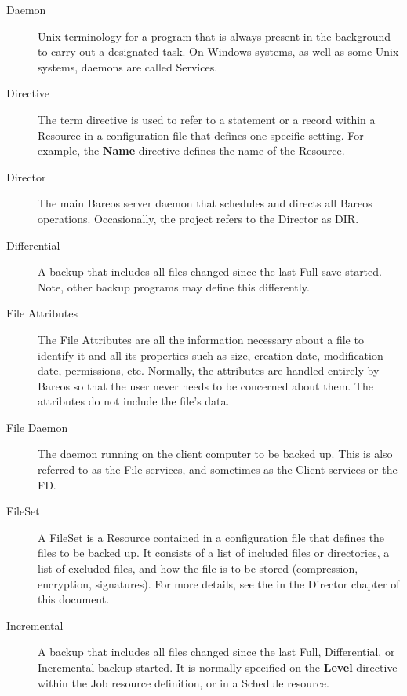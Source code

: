 \begin{description}
\item [Daemon]
   Unix terminology for a program that is always present in  the background to
   carry out a designated task. On Windows systems, as well as some Unix
   systems, daemons are called Services.

\item [Directive]
   The term directive is used to refer to a statement or a record within a
   Resource in a configuration file that defines one specific setting.  For
   example, the {\bf Name} directive defines the name of the Resource.

\item [Director]
   The main Bareos server daemon that schedules and directs all  Bareos
   operations. Occasionally, the project refers to the Director as DIR.

\item [Differential]
   A backup that includes all files changed since the last  Full save started.
   Note, other backup programs may define this differently.

\item [File Attributes]
   The File Attributes are all the information  necessary about a file to
   identify it and all its properties such as  size, creation date, modification
   date, permissions, etc. Normally, the  attributes are handled entirely by
   Bareos so that the user never  needs to be concerned about them. The
   attributes do not include the  file's data.

\item [File Daemon]
   The daemon running on the client  computer to be backed up. This is also
   referred to as the File  services, and sometimes as the Client services or the
   FD.

\label{FileSetDef}
\item [FileSet]
   A FileSet is a Resource contained in a configuration file that defines
   the files to be backed up.  It consists of a list of included files or
   directories, a list of excluded files, and how the file is to be stored
   (compression, encryption, signatures).  For more details, see the
    in the Director
   chapter of this document.

\item [Incremental]
   A backup that includes all files changed since the  last Full, Differential,
   or Incremental backup started. It is normally  specified on the {\bf Level}
   directive within the Job resource  definition, or in a Schedule resource.


\end{description}
